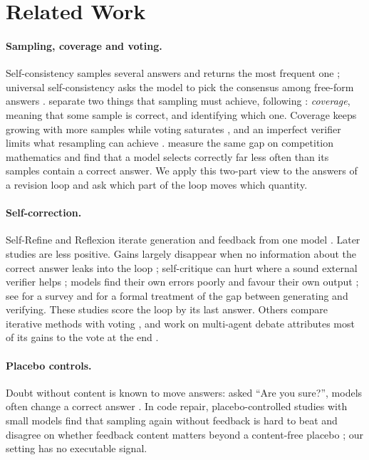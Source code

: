 \documentclass[11pt]{article}
\begin{document}
\section{Related Work}

\paragraph{Sampling, coverage and voting.}
Self-consistency samples several answers and returns the most frequent one \citep{wang2023selfconsistency,aggarwal2023adaptive}; universal self-consistency asks the model to pick the consensus among free-form answers \citep{chen2023usc}.
\citet{brown2024monkeys} separate two things that sampling must achieve, following \citet{chen2021codex}: \emph{coverage}, meaning that some sample is correct, and identifying which one.
Coverage keeps growing with more samples while voting saturates \citep{chen2024morecalls}, and an imperfect verifier limits what resampling can achieve \citep{stroebl2024flaws}.
\citet{jain2026cliff} measure the same gap on competition mathematics and find that a model selects correctly far less often than its samples contain a correct answer.
We apply this two-part view to the answers of a revision loop and ask which part of the loop moves which quantity.

\paragraph{Self-correction.}
Self-Refine and Reflexion iterate generation and feedback from one model \citep{madaan2023selfrefine,shinn2023reflexion}.
Later studies are less positive.
Gains largely disappear when no information about the correct answer leaks into the loop \citep{huang2024cannot}; self-critique can hurt where a sound external verifier helps \citep{stechly2024selfverification}; models find their own errors poorly \citep{tyen2024cannot} and favour their own output \citep{xu2024pride}; see \citet{kamoi2024when} for a survey and \citet{song2024mindgap} for a formal treatment of the gap between generating and verifying.
These studies score the loop by its last answer.
Others compare iterative methods with voting \citep{bilal2026refining,wang2024token}, and work on multi-agent debate attributes most of its gains to the vote at the end \citep{smit2024mad,choi2025debate}.

\paragraph{Placebo controls.}
Doubt without content is known to move answers: asked ``Are you sure?'', models often change a correct answer \citep{laban2024flipflop}.
In code repair, placebo-controlled studies with small models find that sampling again without feedback is hard to beat and disagree on whether feedback content matters beyond a content-free placebo \citep{iscan2026falsification,iscan2026form,verma2026blind}; our setting has no executable signal.
\end{document}
